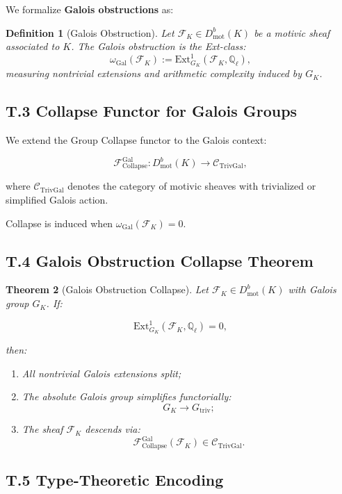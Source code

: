\documentclass[11pt]{article}
\newtheorem{theorem}{Theorem}[section]
\newtheorem{definition}[theorem]{Definition}
\begin{document}
We formalize \textbf{Galois obstructions} as:

\begin{definition}[Galois Obstruction]
Let $\mathcal{F}_K \in D^b_{\mathrm{mot}}(K)$ be a motivic sheaf associated to $K$. The Galois obstruction is the Ext-class:
\[
\omega_{\mathrm{Gal}}(\mathcal{F}_K) := \mathrm{Ext}^1_{G_K}(\mathcal{F}_K, \mathbb{Q}_\ell),
\]
measuring nontrivial extensions and arithmetic complexity induced by $G_K$.
\end{definition}

\subsection*{T.3 Collapse Functor for Galois Groups}

We extend the Group Collapse functor to the Galois context:

\[
\mathcal{F}_{\mathrm{Collapse}}^{\mathrm{Gal}} : D^b_{\mathrm{mot}}(K) \longrightarrow \mathcal{C}_{\mathrm{TrivGal}},
\]

where $\mathcal{C}_{\mathrm{TrivGal}}$ denotes the category of motivic sheaves with trivialized or simplified Galois action.

Collapse is induced when $\omega_{\mathrm{Gal}}(\mathcal{F}_K) = 0$.

\subsection*{T.4 Galois Obstruction Collapse Theorem}

\begin{theorem}[Galois Obstruction Collapse]
Let $\mathcal{F}_K \in D^b_{\mathrm{mot}}(K)$ with Galois group $G_K$. If:

\[
\mathrm{Ext}^1_{G_K}(\mathcal{F}_K, \mathbb{Q}_\ell) = 0,
\]

then:
\begin{enumerate}
    \item All nontrivial Galois extensions split;
    \item The absolute Galois group simplifies functorially:
    \[
    G_K \longrightarrow G_{\mathrm{triv}};
    \]
    \item The sheaf $\mathcal{F}_K$ descends via:
    \[
    \mathcal{F}_{\mathrm{Collapse}}^{\mathrm{Gal}}(\mathcal{F}_K) \in \mathcal{C}_{\mathrm{TrivGal}}.
    \]
\end{enumerate}
\end{theorem}

\subsection*{T.5 Type-Theoretic Encoding}
\end{document}
